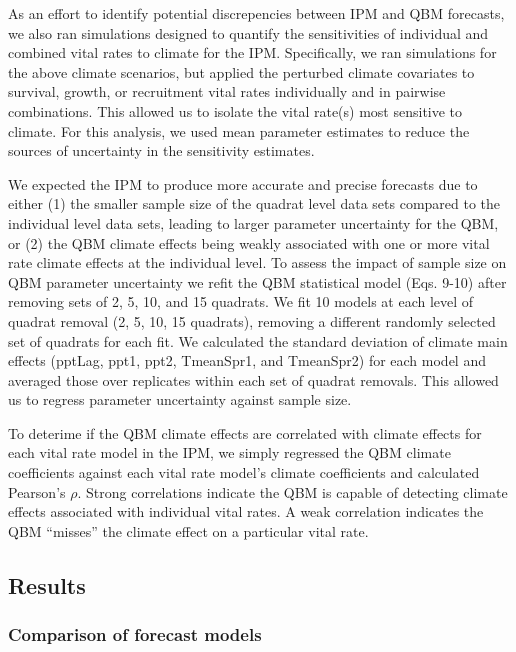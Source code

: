\documentclass[12pt,]{article}
\begin{document}
As an effort to identify potential discrepencies between IPM and QBM
forecasts, we also ran simulations designed to quantify the
sensitivities of individual and combined vital rates to climate for the
IPM. Specifically, we ran simulations for the above climate scenarios,
but applied the perturbed climate covariates to survival, growth, or
recruitment vital rates individually and in pairwise combinations. This
allowed us to isolate the vital rate(s) most sensitive to climate. For
this analysis, we used mean parameter estimates to reduce the sources of
uncertainty in the sensitivity estimates.

We expected the IPM to produce more accurate and precise forecasts due
to either (1) the smaller sample size of the quadrat level data sets
compared to the individual level data sets, leading to larger parameter
uncertainty for the QBM, or (2) the QBM climate effects being weakly
associated with one or more vital rate climate effects at the individual
level. To assess the impact of sample size on QBM parameter uncertainty
we refit the QBM statistical model (Eqs. 9-10) after removing sets of 2,
5, 10, and 15 quadrats. We fit 10 models at each level of quadrat
removal (2, 5, 10, 15 quadrats), removing a different randomly selected
set of quadrats for each fit. We calculated the standard deviation of
climate main effects (pptLag, ppt1, ppt2, TmeanSpr1, and TmeanSpr2) for
each model and averaged those over replicates within each set of quadrat
removals. This allowed us to regress parameter uncertainty against
sample size.

To deterime if the QBM climate effects are correlated with climate
effects for each vital rate model in the IPM, we simply regressed the
QBM climate coefficients against each vital rate model's climate
coefficients and calculated Pearson's \(\rho\). Strong correlations
indicate the QBM is capable of detecting climate effects associated with
individual vital rates. A weak correlation indicates the QBM ``misses''
the climate effect on a particular vital rate.

\subsection{Results}\label{results}

\subsubsection{Comparison of forecast
models}\label{comparison-of-forecast-models}
\end{document}
